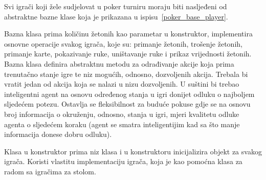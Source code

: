 
Svi igrači koji žele sudjelovat u poker turniru moraju biti nasljeđeni od abstraktne bazne klase  koja je prikazana u ispisu~\ref{poker_base_player}. 


Bazna klasa prima količinu žetonih kao parametar u konstruktor, implementira osnovne operacije svakog igrača, koje su: primanje žetonih, trošenje žetonih, primanje karte, pokazivanje ruke, uništavanje ruke i prikaz vrijednosti žetonih. Bazna klasa definira abstraktnu metodu  za odrađivanje akcije koja prima trenutačno stanje igre te niz mogućih, odnosno, dozvoljenih akcija. Trebala bi vratit jedan od akcija koja se nalazi u nizu dozvoljenih. U suštini bi trebao inteligentni agent na osnovu određenog stanja u igri donijet odluku o najboljem sljedećem potezu. Ostavlja se fleksibilnost za buduće pokuse gdje se na osnovu broj informacija o okruženju, odnosno, stanja u igri, mjeri kvalitetu odluke agenta o sljedećem koraku (agent se smatra inteligentijim kad sa što manje informacija donese dobru odluku). 


Klasa  u konstruktor prima niz klasa  i u konstruktoru inicijalizira objekt za svakog igrača. Koristi vlastitu implementaciju igrača, koja je kao pomoćna klasa za radom sa igračima za stolom. 


